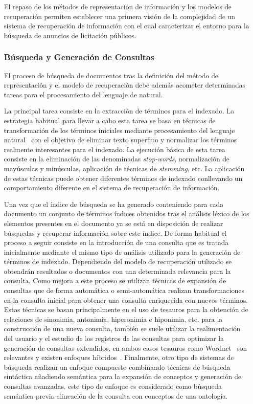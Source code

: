 El repaso de los métodos de representación de información y los modelos de recuperación 
permiten establecer una primera visión de la complejidad de un sistema de recuperación 
de información con el cual caracterizar el entorno para la búsqueda de anuncios 
de licitación públicos.

\subsubsection{Búsqueda y Generación de Consultas}
El proceso de búsqueda de documentos tras la definición del método de representación y el 
modelo de recuperación debe además acometer determinadas tareas para el procesamiento 
del lenguaje de natural. 

La principal tarea consiste en la extracción de términos para el indexado. 
La estrategia habitual para llevar a cabo esta tarea se basa en técnicas de transformación de los términos iniciales 
mediante procesamiento del lenguaje natural~\cite{Wilcock:2009:ILA:1717999} con el 
objetivo de eliminar texto superfluo y normalizar los términos realmente interesantes 
para el indexado. La ejecución básica de esta tarea consiste en la eliminación 
de las denominadas \textit{stop-words}, normalización de mayúsculas y minúsculas, 
aplicación de técnicas de \textit{stemming}, etc. La aplicación de estas 
técnicas puede obtener diferentes términos de indexado conllevando un comportamiento 
diferente en el sistema de recuperación de información.

Una vez que el índice de búsqueda se ha generado conteniendo para cada documento 
un conjunto de términos índices obtenidos tras el análisis léxico de los elementos 
presentes en el documento ya se está en disposición de realizar búsquedas y 
recuperar información sobre este índice. De forma habitual el proceso a seguir consiste 
en la introducción de una consulta que es tratada inicialmente mediante el mismo tipo de análisis 
utilizado para la generación de términos de indexado. Dependiendo del modelo 
de recuperación utilizado se obtendrán resultados o documentos con una determinada 
relevancia para la consulta. Como mejora a este proceso se utilizan técnicas de 
expansión de consultas que de forma automática o semi-automática realizan transformaciones 
en la consulta inicial para obtener una consulta enriquecida con nuevos términos. Estas 
técnicas se basan principalmente en el uso de tesauros para la obtención de relaciones de sinonimia, 
antonimia, hiperonimia e hiponimia, etc. para la construcción de una nueva 
consulta, también se suele utilizar la realimentación del usuario 
y el estudio de los registros de las consultas para optimizar la generación 
de consultas extendidos, en ambos casos tesauros como Wordnet~\cite{Gong:Cheang:U:2006} son relevantes 
y existen enfoques híbridos~\cite{Lisa2010}. Finalmente, otro tipo de sistemas de búsqueda realizan 
un enfoque compuesto combinando técnicas de búsqueda sintáctica añadiendo semántica para la expansión 
de conceptos y generación de consultas avanzadas, este tipo de enfoque es considerado como 
búsqueda semántica previa alineación de la consulta con conceptos de una ontología.

